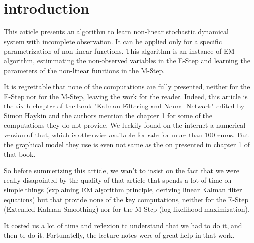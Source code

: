 \section*{introduction}

This article presents an algorithm to learn non-linear stochastic dynamical system with incomplete observation.
It can be applied only for a specific parametrization of non-linear functions.
This algorithm is an instance of EM algorithm, estimmating the non-observed variables in the E-Step and learning the parameters of the non-linear functions in the M-Step.

It is regrettable that none of the computations are fully presented, neither for the E-Step nor for the M-Step, leaving the work for the reader.
Indeed, this article is the sixth chapter of the book "Kalman Filtering and Neural Network" edited by Simon Haykin and the authors mention the chapter 1 for some of the computations they do not provide.
We luckily found on the internet a numerical version of that, which is otherwise available for sale for more than 100 euros.
But the graphical model they use is even not same as the on presented in chapter 1 of that book.

So before summerizing this article, we wan't to insist on the fact that we were really disapointed by the quality of that article that spends a lot of time on simple things (explaining EM algorithm principle, deriving linear Kalman filter equations) but that provide none of the key computations, neither for the E-Step (Extended Kalman Smoothing) nor for the M-Step (log likelihood maximization).

It costed us a lot of time and reflexion to understand that we had to do it, and then to do it.
Fortunatelly, the lecture notes were of great help in that work.
